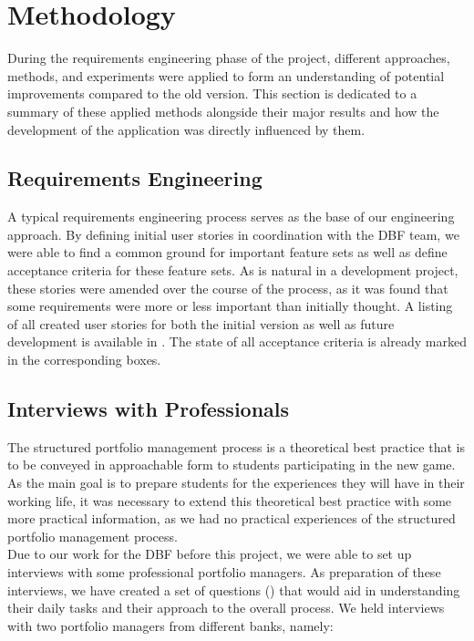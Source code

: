 \section{Methodology}
\label{sec:methodology}

During the requirements engineering phase of the project, different approaches, methods, and experiments were applied to form an understanding of potential improvements compared to the old version. This section is dedicated to a summary of these applied methods alongside their major results and how the development of the application was directly influenced by them.


\subsection{Requirements Engineering}
A typical requirements engineering process serves as the base of our engineering approach. By defining initial user stories in coordination with the DBF team, we were able to find a common ground for important feature sets as well as define acceptance criteria for these feature sets. As is natural in a development project, these stories were amended over the course of the process, as it was found that some requirements were more or less important than initially thought. A listing of all created user stories for both the initial version as well as future development is available in . The state of all acceptance criteria is already marked in the corresponding boxes.


\subsection{Interviews with Professionals}
The structured portfolio management process is a theoretical best practice that is to be conveyed in approachable form to students participating in the new game. As the main goal is to prepare students for the experiences they will have in their working life, it was necessary to extend this theoretical best practice with some more practical information, as we had no practical experiences of the structured portfolio management process. \\

Due to our work for the DBF before this project, we were able to set up interviews with some professional portfolio managers. As preparation of these interviews, we have created a set of questions () that would aid in understanding their daily tasks and their approach to the overall process. We held interviews with two portfolio managers from different banks, namely:

